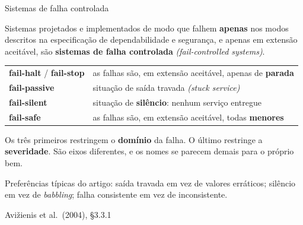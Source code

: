 \documentclass{beamer}
\newcommand{\en}[1]{{\color{depCinza}\textit{#1}}}
\newcommand{\sect}[1]{\par\smallskip\hfill{\tiny\color{black!55}Avi\v{z}ienis et al.\ (2004), #1}}
\begin{document}
\begin{frame}{Sistemas de falha controlada}
    \footnotesize
    \begin{defi}
        \scriptsize
        Sistemas projetados e implementados de modo que falhem \textbf{apenas} nos modos descritos na especifica\c{c}\~ao de dependabilidade e seguran\c{c}a, e apenas em extens\~ao aceit\'avel, s\~ao \textbf{sistemas de falha controlada} \en{(fail-controlled systems)}.
    \end{defi}
    \medskip
    \begin{tabularx}{\linewidth}{@{}p{3.2cm} >{\raggedright\arraybackslash}X@{}}
        \toprule
        \textbf{fail-halt} / \textbf{fail-stop} & as falhas s\~ao, em extens\~ao aceit\'avel, apenas de \textbf{parada} \\
        \textbf{fail-passive} & situa\c{c}\~ao de sa\'ida travada \en{(stuck service)} \\
        \textbf{fail-silent} & situa\c{c}\~ao de \textbf{sil\^encio}: nenhum servi\c{c}o entregue \\
        \textbf{fail-safe} & as falhas s\~ao, em extens\~ao aceit\'avel, todas \textbf{menores} \\
        \bottomrule
    \end{tabularx}
    \medskip
    \begin{ancora}
        \footnotesize
        Os tr\^es primeiros restringem o \textbf{dom\'inio} da falha. O \'ultimo restringe a \textbf{severidade}. S\~ao eixos diferentes, e os nomes se parecem demais para o pr\'oprio bem.
    \end{ancora}
    \medskip
    \begin{pratica}
        \scriptsize
        Prefer\^encias t\'ipicas do artigo: sa\'ida travada em vez de valores err\'aticos; sil\^encio em vez de \textit{babbling}; falha consistente em vez de inconsistente.
    \end{pratica}
    \sect{\S3.3.1}
\end{frame}
\end{document}
